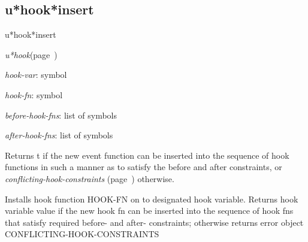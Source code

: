 \subsection{u*hook*insert}
\label{u*hook*insert}

\begin{description}
\item [Name:]  u*hook*insert

\item [Class:]
{\sl u*hook}\hfill(page~\pageref{u*hook})

\item [Parameters:]
\item {\sl hook-var}:  symbol

\item {\sl hook-fn}:  symbol

\item {\sl before-hook-fns}:  list of symbols


\item {\sl after-hook-fns}:  list of symbols



\item [Return-value:]
Returns t if the new event function can be
inserted into the sequence of hook functions in such
a manner as to satisfy the before and after 
constraints, or {\sl conflicting-hook-constraints} (page~\pageref{conflicting-hook-constraints})
otherwise.

\item [Description:]
Installs hook function HOOK-FN on to designated hook
variable.  Returns hook variable value if the new hook fn can
be inserted into the sequence of hook fns that satisfy
required before- and after- constraints; otherwise returns
error object CONFLICTING-HOOK-CONSTRAINTS


\item [Public:]



\end{description}
